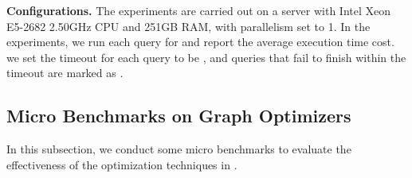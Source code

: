 \noindent\textbf{Configurations. }
The experiments are carried out on a server with Intel Xeon E5-2682 2.50GHz CPU and 251GB RAM, with parallelism set to 1.
In the experiments, we run each query for  and report the average execution time cost.
we set the timeout for each query to be , and queries that fail to finish within the timeout are marked as \ot.

\subsection{Micro Benchmarks on Graph Optimizers}
\label{sec:experiment-opt}
In this subsection, we conduct some micro benchmarks to evaluate the effectiveness of the optimization techniques in \relgo.



